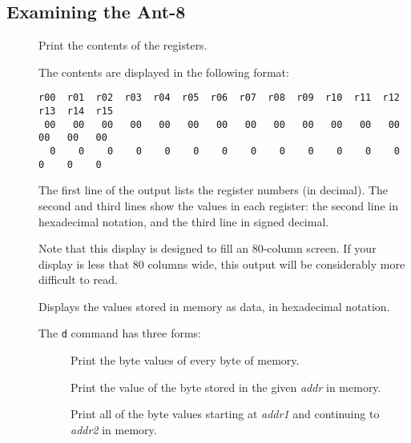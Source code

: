 \subsection{Examining the Ant-8}

\begin{description}

\item[\Large {}]

	Print the contents of the registers.

	The contents are displayed in the following format:

{\small
\begin{verbatim}
r00  r01  r02  r03  r04  r05  r06  r07  r08  r09  r10  r11  r12  r13  r14  r15
 00   00   00   00   00   00   00   00   00   00   00   00   00   00   00   00
  0    0    0    0    0    0    0    0    0    0    0    0    0    0    0    0
\end{verbatim}
}

	The first line of the output lists the register
	numbers (in decimal).  The second and third lines show
	the values in each register:  the second line in
	hexadecimal notation, and the third line in signed
	decimal.

	Note that this display is designed to fill an
	80-column screen.  If your display is less that 80
	columns wide, this output will be considerably more
	difficult to read. 

\item[\Large {}]

	Displays the values stored in memory as data, in hexadecimal
	notation.

	The {\tt d} command has three forms:

	\begin{description}

	\item[]

		Print the byte values of every byte of memory.

	\item[]

		Print the value of the byte stored in the given {\em
		addr} in memory.

	\item[]

		Print all of the byte values starting at {\em addr1}
		and continuing to {\em addr2} in memory.

	\end{description}


\end{description}
